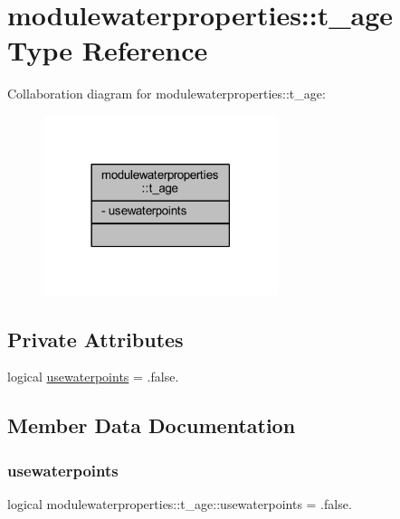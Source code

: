 \hypertarget{structmodulewaterproperties_1_1t__age}{}\section{modulewaterproperties\+:\+:t\+\_\+age Type Reference}
\label{structmodulewaterproperties_1_1t__age}


Collaboration diagram for modulewaterproperties\+:\+:t\+\_\+age\+:\nopagebreak
\begin{figure}[H]
\begin{center}
\leavevmode
\includegraphics[width=194pt]{structmodulewaterproperties_1_1t__age__coll__graph}
\end{center}
\end{figure}
\subsection*{Private Attributes}
\begin{DoxyCompactItemize}
\item 
logical \mbox{\hyperlink{structmodulewaterproperties_1_1t__age_a2b08a1d861c3b724dc3d3085a34a39f7}{usewaterpoints}} = .false.
\end{DoxyCompactItemize}


\subsection{Member Data Documentation}
\mbox{\label{structmodulewaterproperties_1_1t__age_a2b08a1d861c3b724dc3d3085a34a39f7}} 
\subsubsection{\texorpdfstring{usewaterpoints}{usewaterpoints}}
{\footnotesize\ttfamily logical modulewaterproperties\+::t\+\_\+age\+::usewaterpoints = .false.\hspace{0.3cm}{\ttfamily [private]}}



